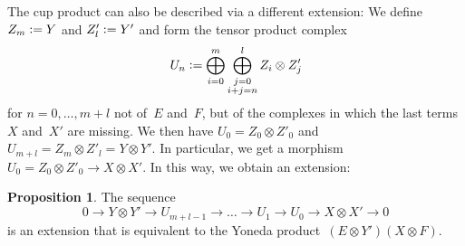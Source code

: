 \documentclass[12pt]{article}
\theoremstyle{definition}
\newtheorem{Proposition}[Satz]{Proposition}
\theoremstyle{break}
\renewcommand{\1}{\mathbbm{1}}
\newcommand{\ot}{\mathbin{\otimes}}
\newcommand{\deq}{\vcentcolon =}
\begin{document}
The cup product can also be described via a different extension: We define $Z_m \deq Y$ and $Z'_l \deq Y'$ and form the tensor product complex
$$U_n \deq \bigoplus_{i=0}^m \bigoplus_{\substack{j=0 \\i+j=n}}^l Z_{i} \ot Z'_{j}$$
for $n=0,\ldots,m+l$ not of~$E$ and~$F$, but of the complexes in which the last terms~$X$ and~$X'$ are missing. We then have $U_0 = Z_0 \ot Z'_0$ and
$U_{m+l} = Z_m \ot Z'_l = Y \ot Y'$. In particular, we get a morphism
$U_0 = Z_0 \ot Z'_0 \to X \ot X'$. In this way, we obtain an extension:
\begin{Proposition} \label{RepCupProd}
The sequence
\[ 0 \to Y \ot Y' \to U_{m+l-1} \to \dots \to U_1 \to U_0 \to X \ot X' \to 0\]
is an extension that is equivalent to the Yoneda product~$(E \ot Y') (X \ot F)$.
\end{Proposition}
\end{document}
